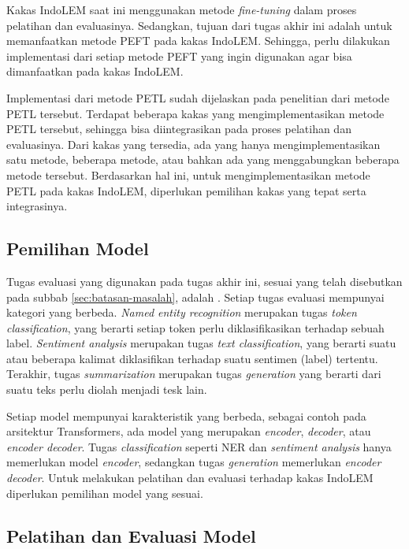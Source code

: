 Kakas IndoLEM saat ini menggunakan metode \textit{fine-tuning} dalam proses pelatihan dan evaluasinya. Sedangkan, tujuan dari tugas akhir ini adalah untuk memanfaatkan metode PEFT pada kakas IndoLEM. Sehingga, perlu dilakukan implementasi dari setiap metode PEFT yang ingin digunakan agar bisa dimanfaatkan pada kakas IndoLEM.

Implementasi dari metode PETL sudah dijelaskan pada penelitian dari metode PETL tersebut. Terdapat beberapa kakas yang mengimplementasikan metode PETL tersebut, sehingga bisa diintegrasikan pada proses pelatihan dan evaluasinya. Dari kakas yang tersedia, ada yang hanya mengimplementasikan satu metode, beberapa metode, atau bahkan ada yang menggabungkan beberapa metode tersebut. Berdasarkan hal ini, untuk mengimplementasikan metode PETL pada kakas IndoLEM, diperlukan pemilihan kakas yang tepat serta integrasinya.

\subsection{Pemilihan Model}

Tugas evaluasi yang digunakan pada tugas akhir ini, sesuai yang telah disebutkan pada subbab \ref{sec:batasan-masalah}, adalah \nlptask. Setiap tugas evaluasi mempunyai kategori yang berbeda. \textit{Named entity recognition} merupakan tugas \textit{token classification}, yang berarti setiap token perlu diklasifikasikan terhadap sebuah label. \textit{Sentiment analysis} merupakan tugas \textit{text classification},  yang berarti suatu atau beberapa kalimat diklasifikan terhadap suatu sentimen (label) tertentu. Terakhir, tugas \textit{summarization} merupakan tugas \textit{generation} yang berarti dari suatu teks perlu diolah menjadi tesk lain.

Setiap model mempunyai karakteristik yang berbeda, sebagai contoh pada arsitektur Transformers, ada model yang merupakan \textit{encoder}, \textit{decoder}, atau \textit{encoder decoder}. Tugas \textit{classification} seperti NER dan \textit{sentiment analysis} hanya memerlukan model \textit{encoder}, sedangkan tugas \textit{generation} memerlukan \textit{encoder decoder}. Untuk melakukan pelatihan dan evaluasi terhadap kakas IndoLEM diperlukan pemilihan model yang sesuai.

\subsection{Pelatihan dan Evaluasi Model}

